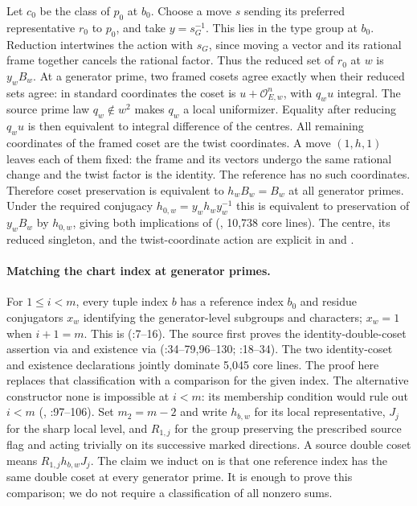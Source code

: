 Let $c_0$ be the class of $p_0$ at $b_0$. Choose a move $s$ sending its
preferred representative $r_0$ to $p_0$, and take $y=s_G^{-1}$. This
lies in the type group at $b_0$. Reduction intertwines the action with
$s_G$, since moving a vector and its rational frame together cancels
the rational factor. Thus the reduced set of $r_0$ at $w$ is $y_w B_w$.
At a generator prime, two framed cosets agree exactly when their
reduced sets agree: in standard coordinates the coset is
$u+\mathcal O_{E,w}^n$, with $q_w u$ integral. The source prime law
$q_w\notin w^2$ makes $q_w$ a local uniformizer. Equality after reducing
$q_w u$ is then equivalent to integral difference of the centres.
All remaining coordinates of the framed coset are the twist coordinates.
A move $(1,h,1)$ leaves each of them fixed: the frame and its vectors
undergo the same rational change and the twist factor is the identity.
The reference has no such coordinates. Therefore coset preservation is
equivalent to $h_w B_w=B_w$ at all generator primes. Under the required
conjugacy $h_{0,w}=y_wh_wy_w^{-1}$ this is equivalent to preservation
of $y_w B_w$ by $h_{0,w}$, giving both implications of
(,
10,738 core lines). The centre, its reduced singleton, and the
twist-coordinate action are explicit in
and .

\paragraph{Matching the chart index at generator primes.}
For $1\le i<m$, every tuple index $b$ has a reference index $b_0$
and residue conjugators $x_w$ identifying the generator-level subgroups
and characters; $x_w=1$ when $i+1=m$. This is
(:7--16).
The source first proves the identity-double-coset assertion
 via  and existence 
via  (:34--79,96--130;
:18--34).
The two identity-coset and existence declarations jointly dominate
5,045 core lines. The proof here replaces that classification with a
comparison for the given index. The alternative  constructor
$\mathrm{none}$ is impossible at $i<m$: its membership condition
would rule out $i<m$ (,
:97--106).
Set $m_2=m-2$ and write $h_{b,w}$ for its local representative,
$J_j$ for the sharp local level, and $R_{1,j}$ for the group preserving
the prescribed source flag and acting trivially on its successive marked
directions. A source double coset means $R_{1,j}h_{b,w}J_j$.
The claim we induct on is that one reference index has the same
double coset at every generator prime. It is enough to prove this
comparison; we do not require a classification of all nonzero sums.

